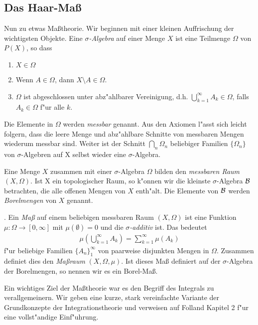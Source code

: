 \subsection{Das Haar-Maß}
	Nun zu etwas Maßtheorie. 
	Wir beginnen mit einer kleinen Auffrischung der wichtigsten Objekte. 
	Eine \emph{$\sigma$-Algebra} auf einer Menge $X$ ist eine Teilmenge $\Omega$ von $P(X)$, so dass
	\begin{enumerate}[label=(\roman*)]
		\item $X \in \Omega$
		\item Wenn $A \in \Omega$, dann $X\setminus A \in \Omega$.
		\item $\Omega$ ist abgeschlossen unter abz"ahlbarer Vereinigung, d.h. $\bigcup_{k=1}^{\infty} A_k \in \Omega$, falls $A_k \in \Omega$ f"ur alle $k$.
	\end{enumerate}
	Die Elemente in $\Omega$ werden \emph{messbar} genannt. 
	Aus den Axiomen l"asst sich leicht folgern, dass die leere Menge und abz"ahlbare Schnitte von messbaren Mengen wiederum messbar sind. 
	Weiter ist der Schnitt $\bigcap_n \Omega_n$ beliebiger Familien $\{\Omega_n\}$ von $\sigma$-Algebren auf X selbst wieder eine $\sigma$-Algebra.
	
	
	Eine Menge $X$ zusammen mit einer $\sigma$-Algebra $\Omega$ bilden den \emph{messbaren Raum} $(X, \Omega)$. 
	Ist X ein topologischer Raum, so k"onnen wir die kleinste $\sigma$-Algebra $\mathcal{B}$ betrachten, die alle offenen Mengen von $X$ enth"alt. 
	Die Elemente von $\mathcal{B}$ werden \emph{Borelmengen} von $X$ genannt.
	
	. 
	Ein \emph{Maß} auf einem beliebigen messbaren Raum $(X, \Omega)$ ist eine Funktion $\mu: \Omega \to [0, \infty]$ mit $\mu(\emptyset) = 0$ und die \emph{$\sigma$-additiv} ist. 
	Das bedeutet
	\begin{align*}
		\mu\left( \bigcup_{k=1}^{\infty} A_k\right) = \sum_{k=1}^{\infty} \mu (A_k)
	\end{align*}
	f"ur beliebige Familien $\{A_n\}_1^\infty$ von paarweise disjunkten Mengen in $\Omega$.
	Zusammen definiet dies den \emph{Maßraum} $(X, \Omega, \mu)$.
	Ist dieses Maß definiert auf der $\sigma$-Algebra der Borelmengen, so nennen wir es ein Borel-Maß.
	
	Ein wichtiges Ziel der Maßtheorie war es den Begriff des Integrals zu verallgemeinern.
	Wir geben eine kurze, stark vereinfachte Variante der Grundkonzepte der Integrationstheorie und verweisen auf Folland \cite{folland} Kapitel 2 f"ur eine vollst"andige Einf"uhrung.
	
